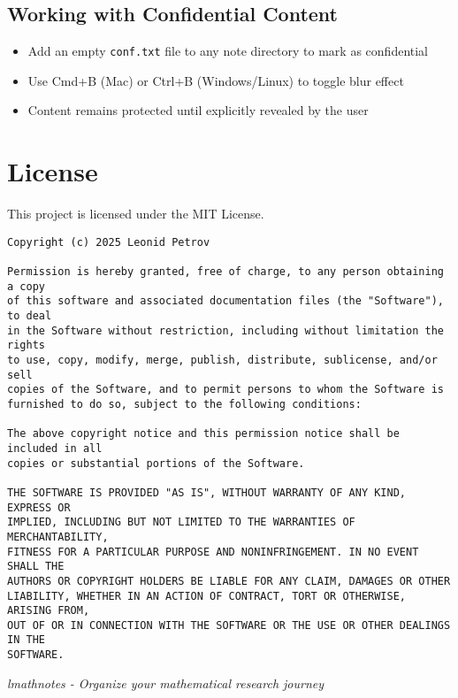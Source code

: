 \documentclass{article}
\begin{document}
\subsection{Working with Confidential Content}
\begin{itemize}
  \item Add an empty \texttt{conf.txt} file to any note directory to mark as confidential
  \item Use Cmd+B (Mac) or Ctrl+B (Windows/Linux) to toggle blur effect
  \item Content remains protected until explicitly revealed by the user
\end{itemize}

\section{License}

This project is licensed under the MIT License.

\begin{verbatim}
Copyright (c) 2025 Leonid Petrov

Permission is hereby granted, free of charge, to any person obtaining a copy
of this software and associated documentation files (the "Software"), to deal
in the Software without restriction, including without limitation the rights
to use, copy, modify, merge, publish, distribute, sublicense, and/or sell
copies of the Software, and to permit persons to whom the Software is
furnished to do so, subject to the following conditions:

The above copyright notice and this permission notice shall be included in all
copies or substantial portions of the Software.

THE SOFTWARE IS PROVIDED "AS IS", WITHOUT WARRANTY OF ANY KIND, EXPRESS OR
IMPLIED, INCLUDING BUT NOT LIMITED TO THE WARRANTIES OF MERCHANTABILITY,
FITNESS FOR A PARTICULAR PURPOSE AND NONINFRINGEMENT. IN NO EVENT SHALL THE
AUTHORS OR COPYRIGHT HOLDERS BE LIABLE FOR ANY CLAIM, DAMAGES OR OTHER
LIABILITY, WHETHER IN AN ACTION OF CONTRACT, TORT OR OTHERWISE, ARISING FROM,
OUT OF OR IN CONNECTION WITH THE SOFTWARE OR THE USE OR OTHER DEALINGS IN THE
SOFTWARE.
\end{verbatim}

\vspace{1cm}
\hrulefill

\begin{center}
\textit{lmathnotes - Organize your mathematical research journey}
\end{center}
\end{document}
